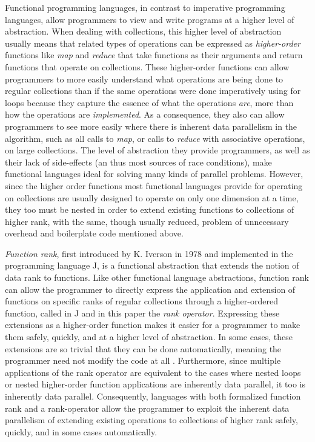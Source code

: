 Functional programming languages, in contrast to imperative programming languages, 
allow programmers to view and write programs at a higher level of abstraction.
When dealing with collections, 
this higher level of abstraction usually means that related types of operations can be expressed as \textit{higher-order} functions 
like \textit{map} and \textit{reduce} that take functions as their arguments and return functions that operate on collections.
These higher-order functions can allow programmers to more easily understand what operations are being done to regular collections 
than if the same operations were done imperatively using for loops 
because they capture the essence of what the operations \textit{are}, more than how the operations are \textit{implemented}.
As a consequence, they also can allow programmers 
to see more easily where there is inherent data parallelism in the algorithm, 
such as all calls to \textit{map}, or calls to \textit{reduce} with associative operations, on large collections. 
The level of abstraction they provide programmers, 
as well as their lack of side-effects (an thus most sources of race conditions), 
make functional languages ideal for solving many kinds of parallel problems.
However, since the higher order functions most functional languages provide for operating on collections 
are usually designed to operate on only one dimension at a time, 
they too must be nested in order to extend existing functions to collections of higher rank, 
with the same, though usually reduced, problem of unnecessary overhead and boilerplate code mentioned above.

\textit{Function rank}, first introduced by K. Iverson in 1978\cite{opandfunc} 
and implemented in the programming language J, 
is a functional abstraction that extends the notion of data rank to functions. 
Like other functional language abstractions, 
function rank can allow the programmer to directly express 
the application and extension of functions on specific ranks of regular collections 
through a higher-ordered function, called in J and in this paper the \textit{rank operator}\cite{jvocab}.
Expressing these extensions as a higher-order function 
makes it easier for a programmer to make them safely, quickly, and at a higher level of abstraction.
In some cases, these extensions are so trivial that they can be done automatically, 
meaning the programmer need not modify the code at all\cite{jvocab} \cite{rankanduni}. 
Furthermore, since multiple applications of the rank operator 
are equivalent to the cases where nested loops or nested higher-order function applications are inherently data parallel, 
it too is inherently data parallel.
Consequently, languages with both formalized function rank and a rank-operator allow the programmer to 
exploit the inherent data parallelism of extending existing operations to collections of higher rank 
safely, quickly, and in some cases automatically.

